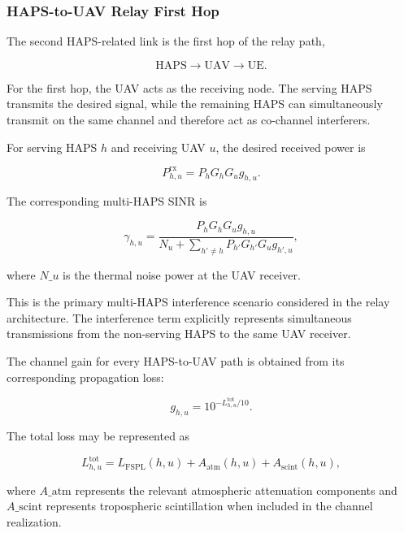 \documentclass[conference]{IEEEtran}
\begin{document}
\subsubsection{HAPS-to-UAV Relay First Hop}

The second HAPS-related link is the first hop of the relay path,

\begin{equation}
\mathrm{HAPS}\rightarrow\mathrm{UAV}\rightarrow\mathrm{UE}.
\end{equation}

For the first hop, the UAV acts as the receiving node. The serving HAPS transmits the desired signal, while the remaining HAPS can simultaneously transmit on the same channel and therefore act as co-channel interferers.

For serving HAPS $h$ and receiving UAV $u$, the desired received power is

\begin{equation}
P_{h,u}^{\mathrm{rx}}
= P_hG_hG_u g_{h,u}.
\end{equation}

The corresponding multi-HAPS SINR is

\begin{equation}
\gamma_{h,u}
=
\frac{
P_hG_hG_u g_{h,u}
}{
N_u + \displaystyle\sum_{h'\neq h}
P_{h'}G_{h'}G_u g_{h',u}
},
\label{eq:haps-uav-sinr}
\end{equation}

where $N\_u$ is the thermal noise power at the UAV receiver.

This is the primary multi-HAPS interference scenario considered in the relay architecture. The interference term explicitly represents simultaneous transmissions from the non-serving HAPS to the same UAV receiver.

The channel gain for every HAPS-to-UAV path is obtained from its corresponding propagation loss:

\begin{equation}
g_{h,u}
= 10^{-L_{h,u}^{\mathrm{tot}}/10}.
\end{equation}

The total loss may be represented as

\begin{equation}
L_{h,u}^{\mathrm{tot}}
=
L_{\mathrm{FSPL}}(h,u)
+ A_{\mathrm{atm}}(h,u)
+ A_{\mathrm{scint}}(h,u),
\end{equation}

where $A\_{\mathrm{atm}}$ represents the relevant atmospheric attenuation components and $A\_{\mathrm{scint}}$ represents tropospheric scintillation when included in the channel realization.
\end{document}
